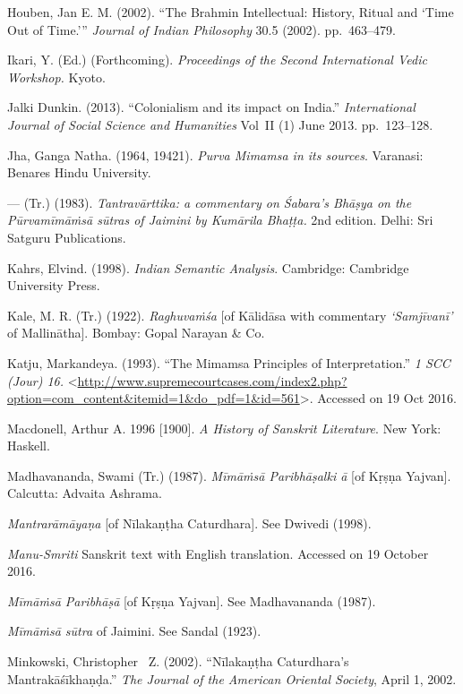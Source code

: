 \begin{thebibliography}{99}
  Houben, Jan E. M. (2002). “The Brahmin Intellectual: History, Ritual and ‘Time Out of Time.’” \textit{Journal of Indian Philosophy} 30.5 (2002). pp.~463--479.

  Ikari, Y. (Ed.) (Forthcoming). \textit{Proceedings of the Second International Vedic Workshop.} Kyoto.

  Jalki Dunkin. (2013). “Colonialism and its impact on India.” \textit{International Journal of Social Science and Humanities} Vol~II (1) June 2013. pp.~123--128.

  Jha, Ganga Natha. (1964, 19421). \textit{Purva Mimamsa in its sources}. Varanasi: Benares Hindu University.

  — (Tr.) (1983). \textit{Tantravārttika: a commentary on Śabara's Bhāṣya on the Pūrvamīmāṁsā sūtras of Jaimini by Kumārila Bhaṭṭa.} 2nd edition. Delhi: Sri Satguru Publications.

  Kahrs, Elvind. (1998). \textit{Indian Semantic Analysis}. Cambridge: Cambridge University Press.

  Kale, M. R. (Tr.) (1922). \textit{Raghuvaṁśa} [of Kālidāsa with commentary \textit{‘Samjīvanī’} of Mallinātha]. Bombay: Gopal Narayan \& Co.

  Katju, Markandeya. (1993). “The Mimamsa Principles of Interpretation.” \textit{1 SCC (Jour) 16.} \textless  \url{http://www.supremecourtcases.com/index2.php?option=com_content&itemid=1&do_pdf=1&id=561}\textgreater . Accessed on 19 Oct 2016.

  Macdonell, Arthur A. 1996 [1900]. \textit{A History of Sanskrit Literature}. New York: Haskell.  

  Madhavananda, Swami (Tr.) (1987). \textit{Mīmāṁsā Paribhāṣalki ā} [of Kṛṣṇa Yajvan]. Calcutta: Advaita Ashrama.

  \textit{Mantrarāmāyaṇa} [of Nīlakaṇṭha Caturdhara]. See Dwivedi (1998).

  \textit{Manu-Smriti} Sanskrit text with English translation. Accessed on 19 October 2016.

  \textit{Mīmāṁsā Paribhāṣā} [of Kṛṣṇa Yajvan]. See Madhavananda (1987).

  \textit{Mīmāṁsā sūtra} of Jaimini. See Sandal (1923).

  Minkowski, Christopher  Z. (2002). “Nīlakaṇṭha Caturdhara's Mantrakāśīkhaṇḍa.” \textit{The Journal of the American Oriental Society}, April 1, 2002.


\end{thebibliography}
